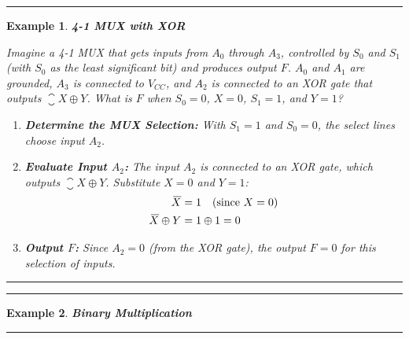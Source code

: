 \documentclass[12pt]{article}
\newtheorem{example}{Example}
\newenvironment{examp}
{\vspace{0.5cm}
 \hrule
\vspace{0.5cm}
\begin{example}}
{\hrule
\vspace{0.5cm}
\end{example}}
\begin{document}
\begin{examp}
	\textbf{4-1 MUX with XOR}

	Imagine a 4-1 MUX that gets inputs from \( A_0 \) through \( A_3 \), controlled by \( S_0 \) and \( S_1 \) (with \( S_0 \) as the least significant bit) and produces output \( F \). \( A_0 \) and \( A_1 \) are grounded, \( A_3 \) is connected to \( V_{CC} \), and \( A_2 \) is connected to an XOR gate that outputs \( \closure{X} \oplus Y \). What is \( F \) when \( S_0 = 0 \), \( X = 0 \), \( S_1 = 1 \), and \( Y = 1 \)?

	\begin{enumerate}
		\item \textbf{Determine the MUX Selection:} With \( S_1 = 1 \) and \( S_0 = 0 \), the select lines choose input \( A_2 \).

		\item \textbf{Evaluate Input \( A_2 \):} The input \( A_2 \) is connected to an XOR gate, which outputs \( \closure{X} \oplus Y \). Substitute \( X = 0 \) and \( Y = 1 \):
		      \begin{align*}
			      {}\mkern3mu\overline{\mkern-3muX}          & = 1 \quad \text{(since \( X = 0 \))} \\
			      {}\mkern3mu\overline{\mkern-3muX} \oplus Y & = 1 \oplus 1 = 0
		      \end{align*}

		\item \textbf{Output \( F \):} Since \( A_2 = 0 \) (from the XOR gate), the output \( F = 0 \) for this selection of inputs.
	\end{enumerate}
\end{examp}

\begin{examp}
	\textbf{Binary Multiplication}

\end{examp}
\end{document}

